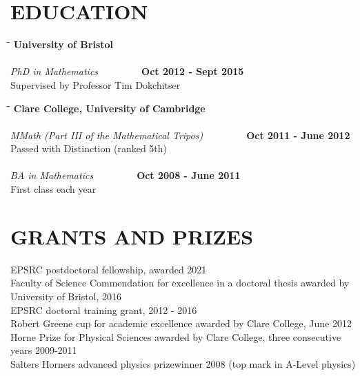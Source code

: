 \documentclass{res}
\begin{document}
\begin{resume}
\section{EDUCATION}          
        
\bigskip

\vspace{-0.1in}	
   \begin{tabbing}
   \hspace{2in}\= \hspace{2in}\= \kill %
    {\bf University of Bristol}\\
 ~\\
      {\it PhD in Mathematics} \>~\> ~~~~~~ {\bf Oct 2012 - Sept 2015} \\       
    Supervised by Professor Tim Dokchitser      
  \end{tabbing}\vspace{-17pt}      %
     \begin{tabbing}
   \hspace{2in}\= \hspace{2in}\= \kill %
    {\bf Clare College, University of Cambridge}\\
~\\
      {\it MMath (Part III of the Mathematical Tripos) } \>~\> ~~~~~~ {\bf Oct 2011 - June 2012}\\       
    Passed with Distinction (ranked 5th) \\   
~\\
      {\it BA in Mathematics } \>~\> ~~~~~~ {\bf Oct 2008 - June 2011} \\       
    First class each year   \\   
\end{tabbing}\vspace{-25pt}   



\section{GRANTS AND PRIZES} 
\bigskip 
EPSRC postdoctoral fellowship, awarded 2021 \medskip \\
    Faculty of Science Commendation for excellence in a doctoral thesis awarded by University of Bristol, 2016 \medskip \\
    EPSRC doctoral training grant, 2012 - 2016 \medskip \\         
    Robert Greene cup for academic excellence awarded by Clare College, June 2012 \medskip \\
Horne Prize for Physical Sciences awarded by Clare College, three consecutive years 2009-2011 \medskip \\
Salters Horners advanced physics prizewinner 2008 (top mark in A-Level physics)      


\end{resume}
\end{document}
